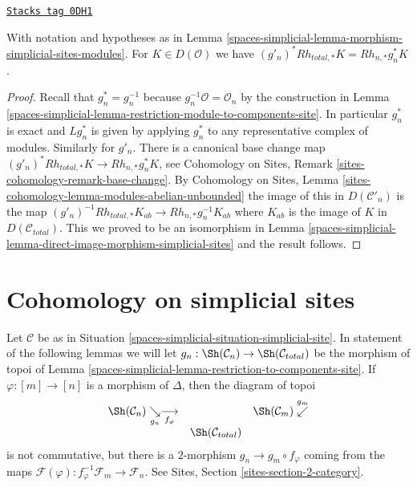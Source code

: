 \begin{lemma}
\label{spaces-simplicial-lemma-direct-image-morphism-simplicial-sites-modules}
\href{https://stacks.math.columbia.edu/tag/0DH1}{\texttt{Stacks tag 0DH1}}

With notation and hypotheses as in
Lemma \ref{spaces-simplicial-lemma-morphism-simplicial-sites-modules}.
For $K \in D(\mathcal{O})$ we have
$(g'_n)^*Rh_{total, *}K = Rh_{n, *}g_n^*K$.
\end{lemma}

\begin{proof}
Recall that $g_n^* = g_n^{-1}$ because $g_n^{-1}\mathcal{O} = \mathcal{O}_n$
by the construction in Lemma \ref{spaces-simplicial-lemma-restriction-module-to-components-site}.
In particular $g_n^*$ is exact and $Lg_n^*$ is given by applying $g_n^*$
to any representative complex of modules. Similarly for $g'_n$.
There is a canonical base change map
$(g'_n)^*Rh_{total, *}K \to Rh_{n, *}g_n^*K$, see
Cohomology on Sites, Remark \ref{sites-cohomology-remark-base-change}.
By Cohomology on Sites, Lemma
\ref{sites-cohomology-lemma-modules-abelian-unbounded}
the image of this in $D(\mathcal{C}'_n)$ is the map
$(g'_n)^{-1}Rh_{total, *}K_{ab} \to Rh_{n, *}g_n^{-1}K_{ab}$
where $K_{ab}$ is the image of $K$ in $D(\mathcal{C}_{total})$.
This we proved to be an isomorphism in
Lemma \ref{spaces-simplicial-lemma-direct-image-morphism-simplicial-sites}
and the result follows.
\end{proof}

\section{Cohomology on simplicial sites}
\label{spaces-simplicial-section-cohomology-simplicial-sites}
Let $\mathcal{C}$ be as in Situation \ref{spaces-simplicial-situation-simplicial-site}.
In statement of the following lemmas we will let
$g_n : \Sh(\mathcal{C}_n) \to \Sh(\mathcal{C}_{total})$ be the
morphism of topoi of
Lemma \ref{spaces-simplicial-lemma-restriction-to-components-site}. If $\varphi : [m] \to [n]$
is a morphism of $\Delta$, then the diagram of topoi
$$
\begin{array}{ccc}\Sh(\mathcal{C}_n) \underset{g_n}{\searrow}\underset{f_\varphi}{\longrightarrow} &  & \Sh(\mathcal{C}_m) \overset{g_m}{\swarrow} \\  & \Sh(\mathcal{C}_{total}) & \end{array}
$$
is not commutative, but there is a $2$-morphism $g_n \to g_m \circ f_\varphi$
coming from the maps
$\mathcal{F}(\varphi) : f_\varphi^{-1}\mathcal{F}_m \to \mathcal{F}_n$.
See Sites, Section \ref{sites-section-2-category}.

